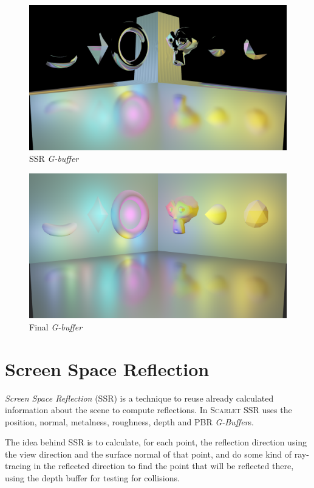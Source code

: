 \documentclass[11pt,a4paper]{report}
\begin{document}
\begin{figure}[htp]
	\centering
	\includegraphics[width=\textwidth]{deferred/07ssr.png}
	\caption{SSR \textit{G-buffer}}
	\label{deferred:ssr}
\end{figure}

\begin{figure}[htp]
	\centering
	\includegraphics[width=\textwidth]{deferred/08final.png}
	\caption{Final \textit{G-buffer}}
	\label{deferred:final}
\end{figure}

\section{Screen Space Reflection}
\textit{Screen Space Reflection} (SSR) is a technique to reuse already calculated information about the scene to compute reflections. In \textsc{Scarlet} SSR uses the position, normal, metalness, roughness, depth and PBR \textit{G-Buffer}s.

The idea behind SSR is to calculate, for each point, the reflection direction using the view direction and the surface normal of that point, and do some kind of ray-tracing in the reflected direction to find the point that will be reflected there, using the depth buffer for testing for collisions.
\end{document}
